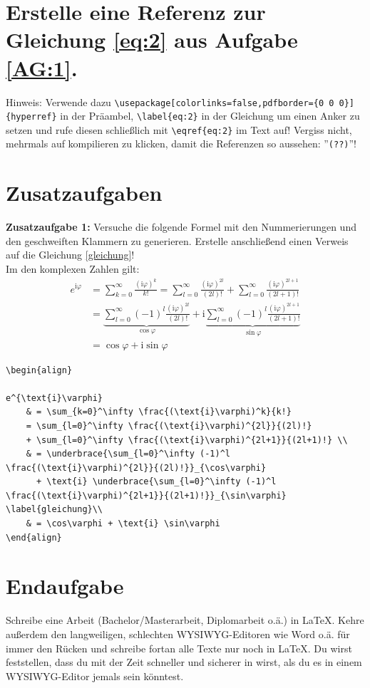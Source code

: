 \section{Erstelle eine Referenz zur Gleichung \eqref{eq:2} aus Aufgabe \ref{AG:1}. }
Hinweis: Verwende dazu \lstinline[style=Latex]+\usepackage[colorlinks=false,pdfborder={0 0 0}]{hyperref}+ in der Präambel, \lstinline[style=Latex]+\label{eq:2}+ in der Gleichung um einen Anker zu setzen und rufe diesen schließlich mit \lstinline[style=Latex]+\eqref{eq:2}+ im Text auf! Vergiss nicht, mehrmals auf kompilieren zu klicken, damit die Referenzen so aussehen: ''\texttt{(??)}''!


\section{Zusatzaufgaben}
\textbf{Zusatzaufgabe 1:} Versuche die folgende Formel mit den Nummerierungen und den geschweiften Klammern zu generieren. Erstelle anschließend einen Verweis auf die Gleichung \eqref{gleichung}!\\

Im den komplexen Zahlen gilt:
\begin{align}
e^{\text{i}\varphi} 
	& = \sum_{k=0}^\infty \frac{(\text{i}\varphi)^k}{k!}
	= \sum_{l=0}^\infty \frac{(\text{i}\varphi)^{2l}}{(2l)!}
	  + \sum_{l=0}^\infty \frac{(\text{i}\varphi)^{2l+1}}{(2l+1)!} \\
	& = \underbrace{\sum_{l=0}^\infty (-1)^l \frac{(\text{i}\varphi)^{2l}}{(2l)!}}_{\cos\varphi}
	  + \text{i} \underbrace{\sum_{l=0}^\infty (-1)^l \frac{(\text{i}\varphi)^{2l+1}}{(2l+1)!}}_{\sin\varphi} \label{gleichung}\\
	& = \cos\varphi + \text{i} \sin\varphi
\end{align}

\begin{Antwort}
\begin{lstlisting}[style=latex]
\begin{align}

e^{\text{i}\varphi} 
	& = \sum_{k=0}^\infty \frac{(\text{i}\varphi)^k}{k!}
	= \sum_{l=0}^\infty \frac{(\text{i}\varphi)^{2l}}{(2l)!}
	+ \sum_{l=0}^\infty \frac{(\text{i}\varphi)^{2l+1}}{(2l+1)!} \\
	& = \underbrace{\sum_{l=0}^\infty (-1)^l \frac{(\text{i}\varphi)^{2l}}{(2l)!}}_{\cos\varphi}
	  + \text{i} \underbrace{\sum_{l=0}^\infty (-1)^l \frac{(\text{i}\varphi)^{2l+1}}{(2l+1)!}}_{\sin\varphi} \label{gleichung}\\
	& = \cos\varphi + \text{i} \sin\varphi
\end{align}
\end{lstlisting}
\end{Antwort}
\newpage

\section{Endaufgabe}
Schreibe eine Arbeit (Bachelor/Masterarbeit, Diplomarbeit o.ä.) in \LaTeX. Kehre außerdem den langweiligen, schlechten WYSIWYG-Editoren wie Word o.ä. für immer den Rücken und schreibe fortan alle Texte nur noch in \LaTeX. Du wirst feststellen, dass du mit der Zeit schneller und sicherer in wirst, als du es in einem WYSIWYG-Editor jemals sein könntest.
